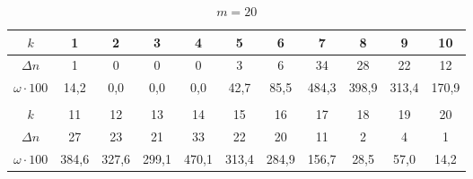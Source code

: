 \documentclass[a4paper,12pt]{article} %
\begin{document}
\begin{table}[]
	\begin{tabular}{ccccccccccc}
		\hline
		\multicolumn{1}{|c|}{$ k $} &
		\multicolumn{1}{c|}{1} &
		\multicolumn{1}{c|}{2} &
		\multicolumn{1}{c|}{3} &
		\multicolumn{1}{c|}{4} &
		\multicolumn{1}{c|}{5} &
		\multicolumn{1}{c|}{6} &
		\multicolumn{1}{c|}{7} &
		\multicolumn{1}{c|}{8} &
		\multicolumn{1}{c|}{9} &
		\multicolumn{1}{c|}{10} \\ \hline
		\multicolumn{1}{|c|}{$ \Delta n$} &
		\multicolumn{1}{c|}{1} &
		\multicolumn{1}{c|}{0} &
		\multicolumn{1}{c|}{0} &
		\multicolumn{1}{c|}{0} &
		\multicolumn{1}{c|}{3} &
		\multicolumn{1}{c|}{6} &
		\multicolumn{1}{c|}{34} &
		\multicolumn{1}{c|}{28} &
		\multicolumn{1}{c|}{22} &
		\multicolumn{1}{c|}{12} \\ \hline
		\multicolumn{1}{|c|}{$ \omega \cdot 100 $} &
		\multicolumn{1}{c|}{14,2} &
		\multicolumn{1}{c|}{0,0} &
		\multicolumn{1}{c|}{0,0} &
		\multicolumn{1}{c|}{0,0} &
		\multicolumn{1}{c|}{42,7} &
		\multicolumn{1}{c|}{85,5} &
		\multicolumn{1}{c|}{484,3} &
		\multicolumn{1}{c|}{398,9} &
		\multicolumn{1}{c|}{313,4} &
		\multicolumn{1}{c|}{170,9} \\ \hline
		&
		&
		&
		&
		&
		&
		&
		&
		&
		&
		\\ \hline
		\multicolumn{1}{|c|}{$ k $} &
		\multicolumn{1}{c|}{11} &
		\multicolumn{1}{c|}{12} &
		\multicolumn{1}{c|}{13} &
		\multicolumn{1}{c|}{14} &
		\multicolumn{1}{c|}{15} &
		\multicolumn{1}{c|}{16} &
		\multicolumn{1}{c|}{17} &
		\multicolumn{1}{c|}{18} &
		\multicolumn{1}{c|}{19} &
		\multicolumn{1}{c|}{20} \\ \hline
		\multicolumn{1}{|c|}{$ \Delta n$} &
		\multicolumn{1}{c|}{27} &
		\multicolumn{1}{c|}{23} &
		\multicolumn{1}{c|}{21} &
		\multicolumn{1}{c|}{33} &
		\multicolumn{1}{c|}{22} &
		\multicolumn{1}{c|}{20} &
		\multicolumn{1}{c|}{11} &
		\multicolumn{1}{c|}{2} &
		\multicolumn{1}{c|}{4} &
		\multicolumn{1}{c|}{1} \\ \hline
		\multicolumn{1}{|c|}{$ \omega \cdot 100 $} &
		\multicolumn{1}{c|}{384,6} &
		\multicolumn{1}{c|}{327,6} &
		\multicolumn{1}{c|}{299,1} &
		\multicolumn{1}{c|}{470,1} &
		\multicolumn{1}{c|}{313,4} &
		\multicolumn{1}{c|}{284,9} &
		\multicolumn{1}{c|}{156,7} &
		\multicolumn{1}{c|}{28,5} &
		\multicolumn{1}{c|}{57,0} &
		\multicolumn{1}{c|}{14,2} \\ \hline
	\end{tabular} \caption{$ m = 20 $}\label{m20}
\end{table}
\end{document}
